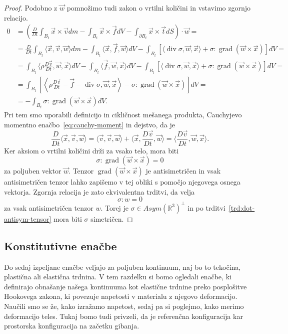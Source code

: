 \documentclass[12pt,a4paper,twoside]{article}
\theoremstyle{definition} %
\theoremstyle{plain} %
\numberwithin{equation}{section}
\newcommand{\R}{\mathbb R}
\renewcommand{\div}{\operatorname{div}}
\newcommand{\grad}{\operatorname{grad}}
\newcommand{\DD}[2]{\ensuremath{\frac{D #1}{D #2}}}
\newcommand{\DDt}[1]{\DD{#1}{t}}
\newcommand{\vv}{\vec{v}}
\newcommand{\vt}{\vec{t}}
\newcommand{\vw}{\vec{w}}
\newcommand{\vf}{\vec{f}}
\newcommand{\vx}{\vec{x}}
\newcommand{\ts}{\sigma}
\begin{document}
\begin{proof}
Podobno z $\vw$ pomnožimo tudi zakon o vrtilni količini in vstavimo zgornjo
relacijo.
\begin{align*}
  0 &= \left(\DDt{}\int_{B_t}\vx \times \vv dm - \int_{B_t} \vx \times \vf dV -
  \int_{\partial B_t} \vx\times\vt dS\right)\cdot \vw = \\ &=
  \DDt{}\int_{B_t}\langle \vx, \vv, \vw\rangle  dm - \int_{B_t} \langle \vx,
  \vf, \vw\rangle dV - \int_{B_t} [\langle \div \ts, \vw, \vx\rangle +  \ts :
  \grad (\vw \times \vx)] dV = \\ &=
  \int_{B_t}\langle \rho \DDt\vv, \vw, \vx \rangle  dV - \int_{B_t} \langle \vf,
  \vw, \vx\rangle dV - \int_{B_t} [\langle \div \ts, \vw, \vx\rangle +  \ts :
  \grad (\vw \times \vx)] dV = \\ &=
\int_{B_t}\left[ \left\langle\rho \DDt\vv - \vf - \div \ts, \vw, \vx\right\rangle -  \ts : \grad
  (\vw \times \vx)\right] dV = \\ &=
- \int_{B_t} \ts : \grad (\vw \times \vx) dV.
\end{align*}
Pri tem smo uporabili definicijo in cikličnost mešanega produkta, Cauchyjevo momentno
enačbo~\eqref{eq:cauchy-moment} in dejstvo, da je
\[
  \DDt{}\langle \vx, \vv, \vw \rangle =
  \langle \vv, \vv, \vw \rangle +
  \langle \vx, \DDt\vv, \vw \rangle =
  \langle \DDt\vv, \vw, \vx \rangle.
\]
Ker aksiom o vrtilni količini drži za vsako telo, mora biti
\[
  \ts : \grad (\vw \times \vx) = 0
\]
za poljuben vektor $\vw$. Tenzor $\grad (\vw \times \vx)$ je antisimetričen in vsak antisimetričen
tenzor lahko zapišemo v tej obliki s pomočjo njegovega osnega vektorja. Zgornja relacija je zato
ekvivalentna trditvi, da velja \[ \ts : w = 0 \] za vsak antisimetričen tenzor $w$.  Torej je $\ts
\in Asym(\R^3)^\perp$ in po trditvi~\ref{trd:dot-antisym-tensor} mora biti $\ts$ simetričen.
\end{proof}

\subsection{Konstitutivne enačbe}
Do sedaj izpeljane enačbe veljajo za poljuben kontinuum, naj bo to tekočina, plastična ali elastična
trdnina. V tem razdelku si bomo ogledali enačbe, ki definirajo obnašanje našega kontinuuma kot
elastične trdnine preko posplošitve Hookovega zakona, ki povezuje napetosti v materialu z njegovo
deformacijo. Naučili smo se že, kako izražamo napetost, sedaj pa si poglejmo, kako merimo
deformacijo teles. Tukaj bomo tudi privzeli, da je referenčna konfiguracija kar prostorska
konfiguracija na začetku gibanja.
\end{document}
